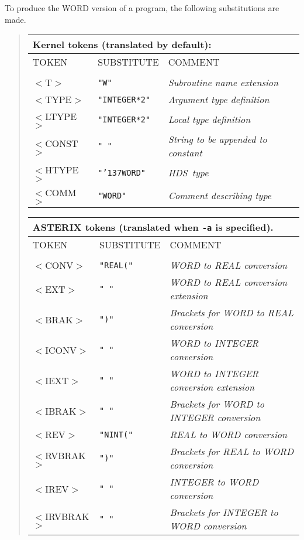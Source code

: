 \documentclass[twoside,11pt]{article}
\renewcommand{\_}{{\tt\char'137}}     %
\newcommand{\HDS}{{\footnotesize HDS}\normalsize}
\begin{document}
To produce the WORD version of a program, the following substitutions
are made.
\begin{quote}
\begin{tabular}{lll}
\multicolumn{3}{l}{\bf{Kernel} tokens (translated by default):}\\
\hline
TOKEN      &SUBSTITUTE     &COMMENT\\
\\
$<$T$>$     &{\tt "W"}         &{\em Subroutine name extension}\\
$<$TYPE$>$  &{\tt "INTEGER*2"} &{\em Argument type definition}\\
$<$LTYPE$>$ &{\tt "INTEGER*2"} &{\em Local type definition}\\
$<$CONST$>$ &{\tt " "}         &{\em String to be appended to constant}\\
$<$HTYPE$>$ &{\tt "\_WORD"}    &{\em \HDS\ type}\\
$<$COMM$>$  &{\tt "WORD"}      &{\em Comment describing type}\\
\end{tabular}

\begin{tabular}{lll}
\multicolumn{3}{l}{\bf{ASTERIX} tokens (translated when {\tt -a} is specified).}\\
\hline
TOKEN      &SUBSTITUTE      &COMMENT\\
\\
$<$CONV$>$     &{\tt "REAL("} &{\em WORD to REAL conversion}\\
$<$EXT$>$      &{\tt " "}     &{\em WORD to REAL conversion extension}\\
$<$BRAK$>$     &{\tt ")"}   &{\em Brackets for WORD to REAL conversion}\\
$<$ICONV$>$    &{\tt " "}     &{\em WORD to INTEGER conversion}\\
$<$IEXT$>$     &{\tt " "}   &{\em WORD to INTEGER conversion extension}\\
$<$IBRAK$>$    &{\tt " "} &{\em Brackets for WORD to INTEGER conversion}\\
$<$REV$>$      &{\tt "NINT("} &{\em REAL to WORD conversion}\\
$<$RVBRAK$>$   &{\tt ")"}  &{\em Brackets for REAL to WORD conversion}\\
$<$IREV$>$     &{\tt " "}     &{\em INTEGER to WORD conversion}\\
$<$IRVBRAK$>$  &{\tt " "} &{\em Brackets for INTEGER to WORD conversion}\\
\end{tabular}
\end{quote}
\end{document}
